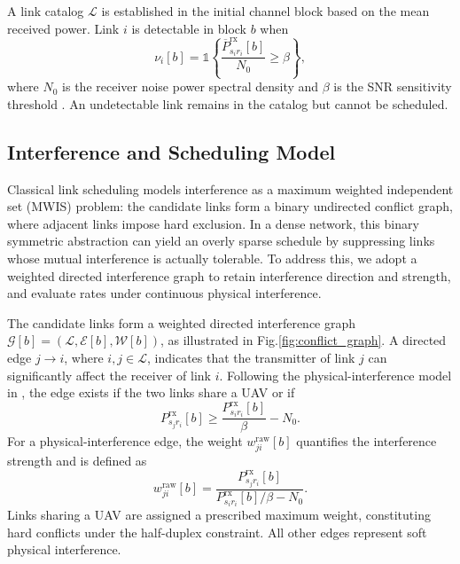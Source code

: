 \documentclass[letterpaper,journal]{IEEEtran}
\begin{document}
	A link catalog $\mathcal{L}$ is established in the initial channel block based on the mean received power. Link $i$ is detectable in block $b$ when
	\begin{equation}
		\nu_i[b] = \mathds{1}\!\left\{ \frac{\overline{P}^{\mathrm{rx}}_{s_i r_i}[b]}{N_0} \geq \beta \right\},
		\label{eq:availability}
	\end{equation}
	where $N_0$ is the receiver noise power spectral density and $\beta$ is the SNR sensitivity threshold \cite{80211be}. An undetectable link remains in the catalog but cannot be scheduled.
	
	\subsection{Interference and Scheduling Model}
	
	Classical link scheduling models interference as a maximum weighted independent set (MWIS) problem: the candidate links form a binary undirected conflict graph, where adjacent links impose hard exclusion. In a dense network, this binary symmetric abstraction can yield an overly sparse schedule by suppressing links whose mutual interference is actually tolerable. To address this, we adopt a weighted directed interference graph to retain interference direction and strength, and evaluate rates under continuous physical interference.
	
	The candidate links form a weighted directed interference graph $\mathcal{G}[b] = (\mathcal{L}, \mathcal{E}[b], \mathcal{W}[b])$, as illustrated in Fig.\@\ref{fig:conflict_graph}. A directed edge $j \rightarrow i$, where $i, j \in \mathcal{L}$, indicates that the transmitter of link $j$ can significantly affect the receiver of link $i$. Following the physical-interference model in \cite{ImpactInterference}, the edge exists if the two links share a UAV or if
	\begin{equation}
		P^{\mathrm{rx}}_{s_j r_i}[b] \geq \frac{P^{\mathrm{rx}}_{s_i r_i}[b]}{\beta} - N_0.
		\label{eq:interference_edge}
	\end{equation}
	For a physical-interference edge, the weight $w_{ji}^{\mathrm{raw}}[b]$ quantifies the interference strength and is defined as
	\begin{equation}
		w_{ji}^{\mathrm{raw}}[b] = \frac{P^{\mathrm{rx}}_{s_j r_i}[b]}
		{P^{\mathrm{rx}}_{s_i r_i}[b]/\beta - N_0}.
		\label{eq:interference_weight}
	\end{equation}
	Links sharing a UAV are assigned a prescribed maximum weight, constituting hard conflicts under the half-duplex constraint. All other edges represent soft physical interference.
	
\end{document}
